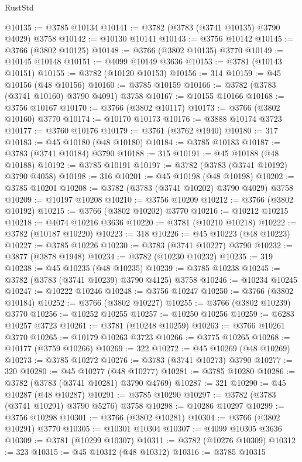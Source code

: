 \begin{lexlean}{RustStd}
\begin{coremodule}
@10135 := @3785 @10134
@10141 := @3782 (@3783 (@3741 @10135) @3790 @4029) @3758
@10142 := @10130 @10141
@10143 := @3756 @10142
@10145 := @3766 (@3802 @10125)
@10148 := @3766 (@3802 @10135) @3770
@10149 := @10145 @10148
@10151 := @4099 @10149 @3636
@10153 := @3781 (@10143 @10151)
@10155 := @3782 (@10120 @10153)
@10156 := 314
@10159 := @45 @10156 (@48 @10156)
@10160 := @3785 @10159
@10166 := @3782 (@3783 (@3741 @10160) @3790 @4091) @3758
@10167 := @10155 @10166
@10168 := @3756 @10167
@10170 := @3766 (@3802 @10117)
@10173 := @3766 (@3802 @10160) @3770
@10174 := @10170 @10173
@10176 := @3888 @10174 @3723
@10177 := @3760 @10176
@10179 := @3761 (@3762 @1940)
@10180 := 317
@10183 := @45 @10180 (@48 @10180)
@10184 := @3785 @10183
@10187 := @3783 (@3741 @10184) @3790
@10188 := 315
@10191 := @45 @10188 (@48 @10188)
@10192 := @3785 @10191
@10197 := @3782 (@3783 (@3741 @10192) @3790 @4058)
@10198 := 316
@10201 := @45 @10198 (@48 @10198)
@10202 := @3785 @10201
@10208 := @3782 (@3783 (@3741 @10202) @3790 @4029) @3758
@10209 := @10197 @10208
@10210 := @3756 @10209
@10212 := @3766 (@3802 @10192)
@10215 := @3766 (@3802 @10202) @3770
@10216 := @10212 @10215
@10218 := @4074 @10216 @3636
@10220 := @3781 (@10210 @10218)
@10222 := @3782 (@10187 @10220)
@10223 := 318
@10226 := @45 @10223 (@48 @10223)
@10227 := @3785 @10226
@10230 := @3783 (@3741 @10227) @3790
@10232 := @3877 (@3878 @1948)
@10234 := @3782 (@10230 @10232)
@10235 := 319
@10238 := @45 @10235 (@48 @10235)
@10239 := @3785 @10238
@10245 := @3782 (@3783 (@3741 @10239) @3790 @4125) @3758
@10246 := @10234 @10245
@10247 := @10222 @10246
@10248 := @3756 @10247
@10250 := @3766 (@3802 @10184)
@10252 := @3766 (@3802 @10227)
@10255 := @3766 (@3802 @10239) @3770
@10256 := @10252 @10255
@10257 := @10250 @10256
@10259 := @6283 @10257 @3723
@10261 := @3781 (@10248 @10259)
@10263 := @3766 @10261 @3770
@10265 := @10179 @10263 @3723
@10266 := @3775 @10265
@10268 := @10177 (@3759 @10266)
@10269 := 322
@10272 := @45 @10269 (@48 @10269)
@10273 := @3785 @10272
@10276 := @3783 (@3741 @10273) @3790
@10277 := 320
@10280 := @45 @10277 (@48 @10277)
@10281 := @3785 @10280
@10286 := @3782 (@3783 (@3741 @10281) @3790 @4769)
@10287 := 321
@10290 := @45 @10287 (@48 @10287)
@10291 := @3785 @10290
@10297 := @3782 (@3783 (@3741 @10291) @3790 @5276) @3758
@10298 := @10286 @10297
@10299 := @3756 @10298
@10301 := @3766 (@3802 @10281)
@10304 := @3766 (@3802 @10291) @3770
@10305 := @10301 @10304
@10307 := @4099 @10305 @3636
@10309 := @3781 (@10299 @10307)
@10311 := @3782 (@10276 @10309)
@10312 := 323
@10315 := @45 @10312 (@48 @10312)
@10316 := @3785 @10315

\end{coremodule}
\end{lexlean}
